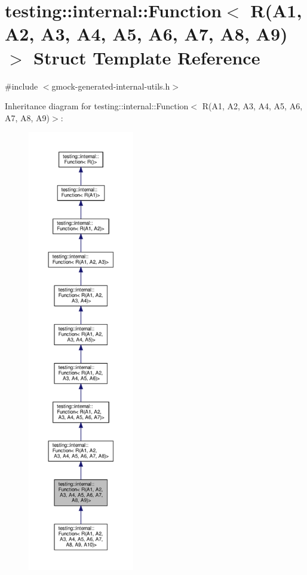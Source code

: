 \hypertarget{structtesting_1_1internal_1_1_function_3_01_r_07_a1_00_01_a2_00_01_a3_00_01_a4_00_01_a5_00_01_a6dfab3ccde80824a59fc4efd5336a27c1}{}\section{testing\+:\+:internal\+:\+:Function$<$ R(A1, A2, A3, A4, A5, A6, A7, A8, A9)$>$ Struct Template Reference}
\label{structtesting_1_1internal_1_1_function_3_01_r_07_a1_00_01_a2_00_01_a3_00_01_a4_00_01_a5_00_01_a6dfab3ccde80824a59fc4efd5336a27c1}


{\ttfamily \#include $<$gmock-\/generated-\/internal-\/utils.\+h$>$}



Inheritance diagram for testing\+:\+:internal\+:\+:Function$<$ R(A1, A2, A3, A4, A5, A6, A7, A8, A9)$>$\+:
\nopagebreak
\begin{figure}[H]
\begin{center}
\leavevmode
\includegraphics[height=550pt]{structtesting_1_1internal_1_1_function_3_01_r_07_a1_00_01_a2_00_01_a3_00_01_a4_00_01_a5_00_01_a6749e44d1d7eef29b18db9c7c0ebfb438}
\end{center}
\end{figure}



